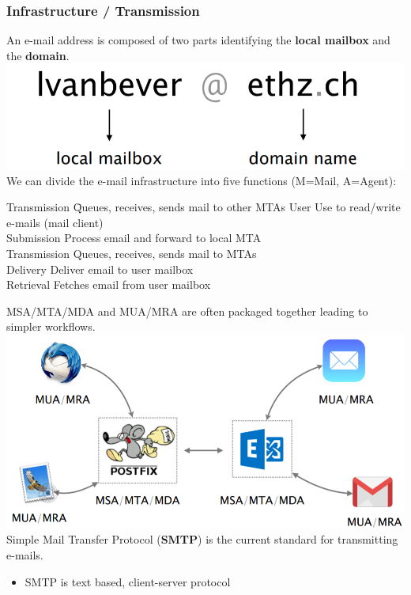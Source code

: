 \documentclass[a4paper, fontsize=8pt, landscape, DIV=1]{scrartcl}
\begin{document}
\begin{multicols*}{4}
		\subsubsection{Infrastructure / Transmission}
		An e-mail address is composed  of two parts identifying the \textbf{local mailbox} and the \textbf{domain}.\\
		\includegraphics[width=\columnwidth]{images/Application_Layer/email_identify.png}
		We can divide the e-mail infrastructure into five functions (M=Mail, A=Agent): 
		\begin{tabbing}
			Transmission \=  Queues, receives, sends mail to other MTAs \kill
			User\> Use to read/write e-mails (mail client)\\
			Submission \> Process email and forward to local MTA\\
			Transmission \> Queues, receives, sends mail to MTAs\\
			Delivery \> Deliver email to user mailbox\\
			Retrieval \> Fetches email from user mailbox
		\end{tabbing}
		MSA/MTA/MDA and MUA/MRA are often packaged together leading to simpler workflows.\\
		\includegraphics[width=\columnwidth]{images/Application_Layer/email_package.png}
		Simple Mail Transfer Protocol (\textbf{SMTP}) is the current standard for transmitting e-mails.
		\begin{itemize}[noitemsep]
			\item SMTP is text based, client-server protocol 

\end{itemize}
\end{multicols*}
\end{document}
